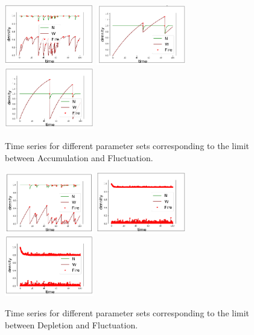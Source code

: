 \documentclass{article}
\begin{document}
\begin{figure}[h!]
\centering
\includegraphics[width=3.9cm]{lim_eq_middle_1.png}
\includegraphics[width=3.9cm]{lim_eq_middle_2.png}
\includegraphics[width=3.9cm]{lim_eq_middle_3.png}
\caption{Time series for different parameter sets corresponding to the limit between Accumulation and Fluctuation.}
\label{fig:casesmid1}
\end{figure}


\begin{figure}[h!]
\centering
\includegraphics[width=3.9cm]{lim_c_middle_1.png}
\includegraphics[width=3.9cm]{lim_c_middle_2.png}
\includegraphics[width=3.9cm]{lim_c_middle_3.png}
\caption{Time series for different parameter sets corresponding to the limit between Depletion and Fluctuation.}
\label{fig:casesmid2}
\end{figure}
\end{document}
